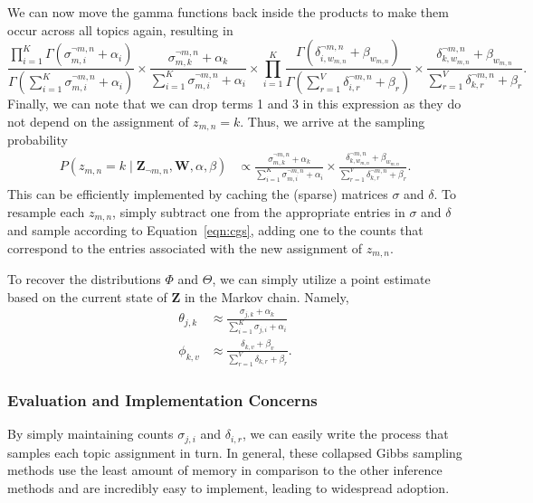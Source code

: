 \documentclass[11pt]{article}
\begin{document}
We can now move the gamma functions back inside the products to make them
occur across all topics again, resulting in
\begin{equation}
  \frac{\prod_{i=1}^K \Gamma(\sigma_{m,i}^{\neg m,n} + \alpha_i)}
  {\Gamma\left(\sum_{i=1}^K \sigma_{m,i}^{\neg m,n} + \alpha_i\right)}
  \times
  \frac{\sigma_{m,k}^{\neg m,n} + \alpha_k}
  {\sum_{i=1}^K \sigma_{m,i}^{\neg m,n} + \alpha_i}
  \times
  \prod_{i=1}^K
  \frac{\Gamma(\delta_{i,w_{m,n}}^{\neg m, n} + \beta_{w_{m,n}})}
  {\Gamma\left(\sum_{r=1}^V \delta_{i,r}^{\neg m, n} + \beta_{r}\right)}
  \times
  \frac{\delta_{k,w_{m,n}}^{\neg m, n} + \beta_{w_{m,n}}}
  {\sum_{r=1}^V \delta_{k,r}^{\neg m, n} + \beta_r}.
\end{equation}
Finally, we can note that we can drop terms 1 and 3 in this expression as
they do not depend on the assignment of $z_{m,n} = k$. Thus, we arrive at the
sampling probability
\begin{align}
  P(z_{m,n} = k \mid \mathbf{Z}_{\neg m,n}, \mathbf{W}, \alpha, \beta)
  &\propto
  \frac{\sigma_{m,k}^{\neg m,n} + \alpha_k}
  {\sum_{i=1}^K \sigma_{m,i}^{\neg m,n} + \alpha_i}
  \times
  \frac{\delta_{k,w_{m,n}}^{\neg m, n} + \beta_{w_{m,n}}}
  {\sum_{r=1}^V \delta_{k,r}^{\neg m, n} + \beta_r}.
  \label{eqn:cgs}
\end{align}
This can be efficiently implemented by caching the (sparse) matrices
$\sigma$ and $\delta$. To resample each $z_{m,n}$, simply subtract one from
the appropriate entries in $\sigma$ and $\delta$ and sample according to
Equation~\ref{eqn:cgs}, adding one to the counts that correspond to the
entries associated with the new assignment of $z_{m,n}$.

To recover the distributions $\Phi$ and $\Theta$, we can simply utilize a
point estimate based on the current state of $\mathbf{Z}$ in the Markov
chain. Namely,
\begin{align}
  \theta_{j,k}
  &\approx
  \frac{\sigma_{j,k} + \alpha_k}
  {\sum_{i=1}^K \sigma_{j,i} + \alpha_i}\\
  \phi_{k,v}
  &\approx
  \frac{\delta_{k,v} + \beta_v}
  {\sum_{r=1}^V \delta_{k,r} + \beta_r}.
\end{align}

\subsubsection{Evaluation and Implementation Concerns}

By simply maintaining counts $\sigma_{j,i}$ and $\delta_{i,r}$, we can
easily write the process that samples each topic assignment in turn. In
general, these collapsed Gibbs sampling methods use the least amount of
memory in comparison to the other inference methods and are incredibly easy
to implement, leading to widespread adoption.
\end{document}
